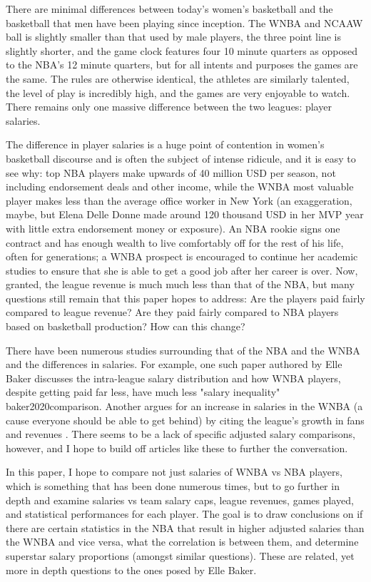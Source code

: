 \documentclass[12pt]{article}
\begin{document}
\par
There are minimal differences between today's women’s basketball and the basketball that men have been playing since inception. The WNBA and NCAAW ball is slightly smaller than that used by male players, the three point line is slightly shorter, and the game clock features four 10 minute quarters as opposed to the NBA’s 12 minute quarters, but for all intents and purposes the games are the same. The rules are otherwise identical, the athletes are similarly talented, the level of play is incredibly high, and the games are very enjoyable to watch. There remains only one massive difference between the two leagues: player salaries.
\par
The difference in player salaries is a huge point of contention in women’s basketball discourse and is often the subject of intense ridicule, and it is easy to see why: top NBA players make upwards of 40 million USD per season, not including endorsement deals and other income, while the WNBA most valuable player makes less than the average office worker in New York (an exaggeration, maybe, but Elena Delle Donne made around 120 thousand USD in her MVP year with little extra endorsement money or exposure). An NBA rookie signs one contract and has enough wealth to live comfortably off for the rest of his life, often for generations; a WNBA prospect is encouraged to continue her academic studies to ensure that she is able to get a good job after her career is over. Now, granted, the league revenue is much much less than that of the NBA, but many questions still remain that this paper hopes to address: Are the players paid fairly compared to league revenue? Are they paid fairly compared to NBA players based on basketball production? How can this change?
\par
There have been numerous studies surrounding that of the NBA and the WNBA and the differences in salaries.
For example, one such paper authored by Elle Baker discusses the intra-league salary distribution and
how WNBA players, despite getting paid far less, have much less "salary inequality"
\citep{}{baker2020comparison}. Another argues for an increase in salaries in the WNBA (a cause everyone
should be able to get behind) by citing the league's growth in fans and revenues \citep{ettienne2019s}.
There seems to be a lack of specific adjusted salary comparisons, however, and I hope to build off articles
like these to further the conversation.
\par
In this paper, I hope to compare not just salaries of WNBA vs NBA players, which is something that has been done numerous times, but to go further in depth and examine salaries vs team salary caps, league revenues, games played, and statistical performances for each player. The goal is to draw conclusions on if there are certain statistics in the NBA that result in higher adjusted salaries than the WNBA and vice versa, what the correlation is between them, and determine superstar salary proportions (amongst similar questions). These are related, yet more in depth questions to the ones posed by Elle Baker.
\end{document}
